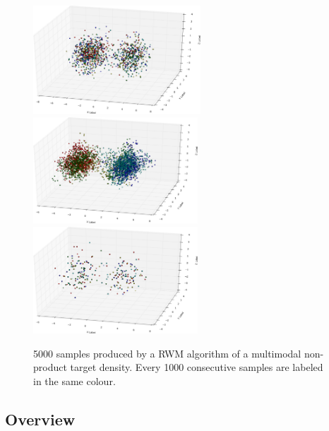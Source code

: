 \begin{figure}[htb]
 \begin{center} 
  \includegraphics[width=0.56\textwidth]{figure_1}
  \vspace*{1mm}
  \vspace*{3mm}
  \includegraphics[width=0.55\textwidth]{figure_2}
  \vspace*{1mm}
  \vspace*{3mm}
  \includegraphics[width=0.55\textwidth]{figure_3}
  \vspace*{1mm}
 \end{center}
  \caption{5000 samples produced by a RWM algorithm of a multimodal non-product target density. Every 1000 consecutive samples are labeled in the same colour.}
  \label{fig:3DscatterplotRWM}
\end{figure}


\subsection*{Overview}

